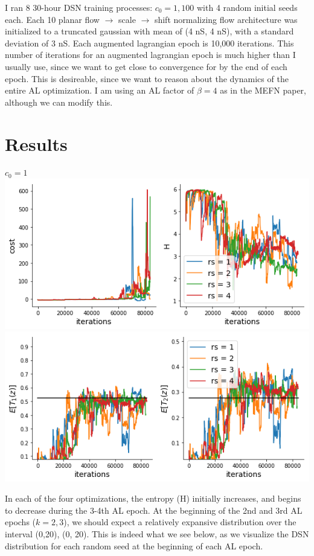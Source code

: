 \documentclass[11pt]{article}
\begin{document}
I ran 8 30-hour DSN training processes: $c_0 = 1, 100$ with 4 random initial seeds each.  Each 10 planar flow $\rightarrow$ scale $\rightarrow$ shift normalizing flow architecture was initialized to a truncated gaussian with mean of (4 nS, 4 nS), with a standard deviation of 3 nS.  Each augmented lagrangian epoch is 10,000 iterations.  This number of iterations for an augmented lagrangian epoch is much higher than I usually use, since we want to get close to convergence for by the end of each epoch.  This is desireable, since we want to reason about the dynamics of the entire AL optimization.  I am using an AL factor of $\beta = 4$ as in the MEFN paper, although we can modify this.

\section{Results}
\begin{center}
{\Large $c_0 = 1$} \\
\includegraphics[scale=0.4]{DSN_figs/STG_DSN_c=0_H.png}
\includegraphics[scale=0.4]{DSN_figs/STG_DSN_c=0_cons.png} 
\end{center}
In each of the four optimizations, the entropy (H) initially increases, and begins to decrease during the 3-4th AL epoch.  At the beginning of the 2nd and 3rd AL epochs ($k=2, 3$), we should expect a relatively expansive distribution over the interval (0,20), (0, 20).  This is indeed what we see below, as we visualize the DSN distribution for each random seed at the beginning of each AL epoch.  
\end{document}
